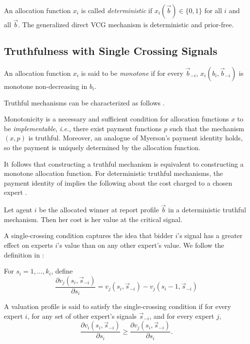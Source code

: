 An allocation function $x_i$ is called {\sl deterministic} if $x_i(\vec{b})\in \{0,1\}$ for all $i$ and all $\vec{b}$.
The generalized direct VCG mechanism is deterministic and prior-free.

\subsection{Truthfulness with Single Crossing Signals}
\begin{defn}[Monotonicity]
	An allocation function $x_i$ is said to be \emph{monotone} if for every $\vec{b}_{-i}$, $x_i(b_i,\vec{b}_{-i})$ is monotone non-decreasing in $b_i$.
\end{defn}

Truthful mechanisms can be characterized as follows \citep{roughgarden2016optimal}.

\begin{prop}\label{prop:char-ic}
	Monotonicity is a necessary and sufficient condition for allocation functions $x$ to be \emph{implementable}, {\sl i.e.}, there exist payment functions $p$ such that the mechanism $(x,p)$ is truthful.  Moreover, an analogue of Myerson's payment identity holds, so the payment is uniquely determined by the allocation function.%
\end{prop}

It follows that constructing a truthful mechanism is equivalent to constructing a monotone allocation function.
For deterministic truthful mechanisms, the payment identity of \citep{roughgarden2016optimal} implies the following about the cost charged to a chosen expert  \citep{eden2018interdependent}.

\begin{prop}\label{prop:deterministic_payment}
	Let agent $i$ be the allocated winner at report profile $\vec{b}$ in a deterministic truthful mechanism. Then her cost is her value at the critical signal.
\end{prop}


A single-crossing condition captures the idea that bidder $i$'s signal has a greater effect on experts $i$'s value than on any other expert's value. We follow the definition in \citep{eden2018interdependent}:

For $s_i = 1, \ldots, k_i$, define $$\frac{\partial v_j(s_i, \vec{s}_{-i})}{\partial s_i} = v_j(s_i, \vec{s}_{-i}) - v_j(s_i - 1, \vec{s}_{-i})$$

\begin{defn}
	A valuation profile is said to satisfy the single-crossing condition if for every expert $i$, for any set of other expert's  signals $\vec{s}_{-i}$, and for every expert $j$, $$\frac{\partial v_i(s_i, \vec{s}_{-i})}{\partial s_i} \geq \frac{\partial v_j(s_i, \vec{s}_{-i})}{\partial s_i}.$$
\end{defn}


